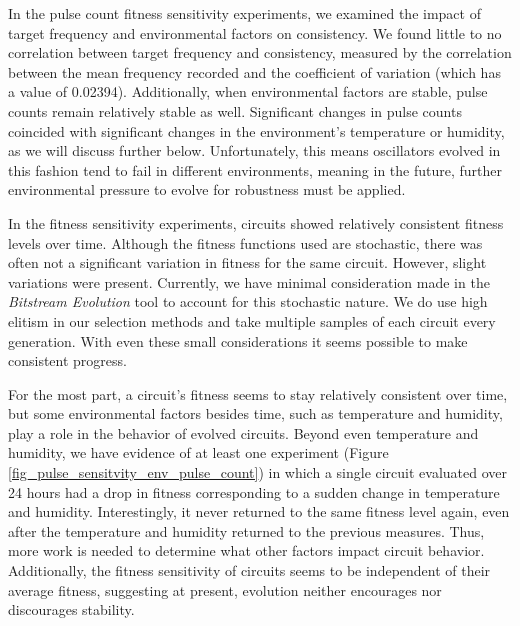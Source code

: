 \documentclass{ieeeaccess}
\begin{document}
In the pulse count fitness sensitivity experiments, we examined the impact of target frequency and environmental factors on consistency. We found little to no correlation between target frequency and consistency, measured by the correlation between the mean frequency recorded and the coefficient of variation (which has a value of 0.02394). Additionally, when environmental factors are stable, pulse counts remain relatively stable as well. Significant changes in pulse counts coincided with significant changes in the environment's temperature or humidity, as we will discuss further below. Unfortunately, this means oscillators evolved in this fashion tend to fail in different environments, meaning in the future, further environmental pressure to evolve for robustness must be applied.

In the fitness sensitivity experiments, circuits showed relatively consistent fitness levels over time. Although the fitness functions used are stochastic, there was often not a significant variation in fitness for the same circuit. However, slight variations were present. Currently, we have minimal consideration made in the \textit{Bitstream Evolution} tool to account for this stochastic nature. We do use high elitism in our selection methods and take multiple samples of each circuit every generation. With even these small considerations it seems possible to make consistent progress. 

For the most part, a circuit's fitness seems to stay relatively consistent over time, but some environmental factors besides time, such as temperature and humidity, play a role in the behavior of evolved circuits. Beyond even temperature and humidity, we have evidence of at least one experiment (Figure   \ref{fig_pulse_sensitvity_env_pulse_count}) in which a single circuit evaluated over 24 hours had a drop in fitness corresponding to a sudden change in temperature and humidity. Interestingly, it never returned to the same fitness level again, even after the temperature and humidity returned to the previous measures. Thus, more work is needed to determine what other factors impact circuit behavior. Additionally, the fitness sensitivity of circuits seems to be independent of their average fitness, suggesting at present, evolution neither encourages nor discourages stability.%
\end{document}
